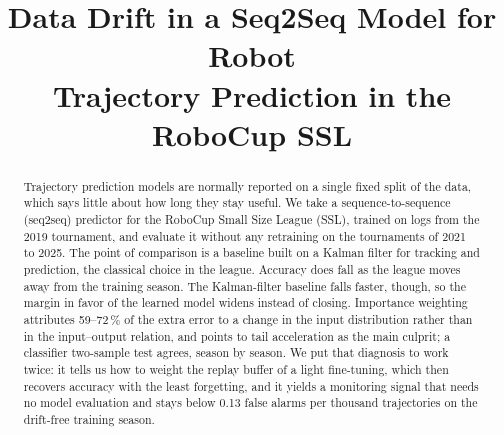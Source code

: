 \documentclass[conference]{IEEEtran}
\begin{document}
\title{Data Drift in a Seq2Seq Model for Robot\\Trajectory Prediction in the RoboCup SSL}

\author{
}
%

\maketitle

\begin{abstract}
Trajectory prediction models are normally reported on a single fixed split of
the data, which says little about how long they stay useful. We take a
sequence-to-sequence (seq2seq) predictor for the RoboCup Small Size League
(SSL), trained on logs from the 2019 tournament, and evaluate it without any
retraining on the tournaments of 2021 to 2025. The point of comparison is a
baseline built on a Kalman filter for tracking and prediction, the classical
choice in the league. Accuracy does fall as the league moves away from the
training season. The Kalman-filter baseline falls faster, though, so the margin
in favor of the learned model widens instead of closing. Importance weighting
attributes 59--72\,\% of the extra error to a change in the input distribution
rather than in the input--output relation, and points to tail acceleration as
the main culprit; a classifier two-sample test agrees, season by season. We put
that diagnosis to work twice: it tells us how to weight the replay buffer of a
light fine-tuning, which then recovers accuracy with the least forgetting, and
it yields a monitoring signal that needs no model evaluation and stays below
0.13 false alarms per thousand trajectories on the drift-free training season.
\end{abstract}
\end{document}
